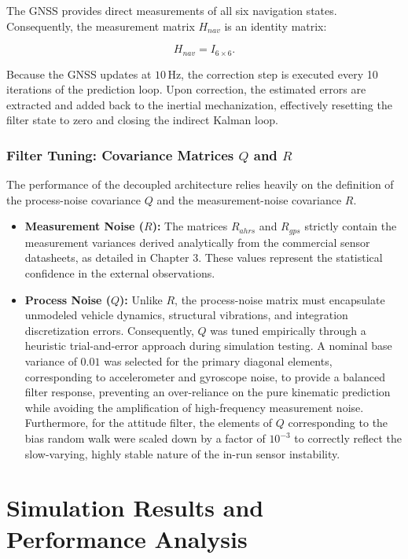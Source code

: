 \documentclass[a4paper,twoside,openany]{report}
\begin{document}
The GNSS provides direct measurements of all six navigation states. Consequently, the measurement matrix $H_{nav}$ is an identity matrix:

\begin{equation}
    H_{nav} = I_{6\times6}.
\end{equation}

Because the GNSS updates at $10\,\mathrm{Hz}$, the correction step is executed every 10 iterations of the prediction loop. Upon correction, the estimated errors are extracted and added back to the inertial mechanization, effectively resetting the filter state to zero and closing the indirect Kalman loop.

\subsection{Filter Tuning: Covariance Matrices $Q$ and $R$}

The performance of the decoupled architecture relies heavily on the definition of the process-noise covariance $Q$ and the measurement-noise covariance $R$.

\begin{itemize}
    \item \textbf{Measurement Noise ($R$):} The matrices $R_{ahrs}$ and $R_{gps}$ strictly contain the measurement variances derived analytically from the commercial sensor datasheets, as detailed in Chapter 3. These values represent the statistical confidence in the external observations.
    \item \textbf{Process Noise ($Q$):} Unlike $R$, the process-noise matrix must encapsulate unmodeled vehicle dynamics, structural vibrations, and integration discretization errors. Consequently, $Q$ was tuned empirically through a heuristic trial-and-error approach during simulation testing. A nominal base variance of $0.01$ was selected for the primary diagonal elements, corresponding to accelerometer and gyroscope noise, to provide a balanced filter response, preventing an over-reliance on the pure kinematic prediction while avoiding the amplification of high-frequency measurement noise. Furthermore, for the attitude filter, the elements of $Q$ corresponding to the bias random walk were scaled down by a factor of $10^{-3}$ to correctly reflect the slow-varying, highly stable nature of the in-run sensor instability.
\end{itemize}

\chapter{Simulation Results and Performance Analysis}
\end{document}

